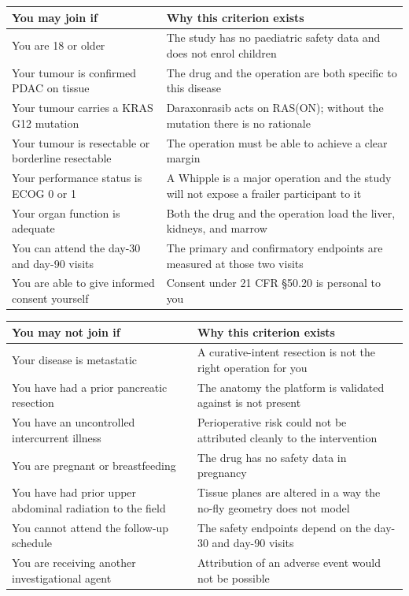 \noindent\begin{tabularx}{\textwidth}{L{5.4cm} Y}
\toprule
\textbf{You may join if} & \textbf{Why this criterion exists} \\
\midrule
You are 18 or older & The study has no paediatric safety data and does not enrol children \\
Your tumour is confirmed PDAC on tissue & The drug and the operation are both specific to this disease \\
Your tumour carries a KRAS G12 mutation & Daraxonrasib acts on RAS(ON); without the mutation there is no rationale \\
Your tumour is resectable or borderline resectable & The operation must be able to achieve a clear margin \\
Your performance status is ECOG 0 or 1 & A Whipple is a major operation and the study will not expose a frailer participant to it \\
Your organ function is adequate & Both the drug and the operation load the liver, kidneys, and marrow \\
You can attend the day-30 and day-90 visits & The primary and confirmatory endpoints are measured at those two visits \\
You are able to give informed consent yourself & Consent under 21 CFR \S 50.20 is personal to you \\
\bottomrule
\end{tabularx}

\vspace{0.30em}

\noindent\begin{tabularx}{\textwidth}{L{5.4cm} Y}
\toprule
\textbf{You may not join if} & \textbf{Why this criterion exists} \\
\midrule
Your disease is metastatic & A curative-intent resection is not the right operation for you \\
You have had a prior pancreatic resection & The anatomy the platform is validated against is not present \\
You have an uncontrolled intercurrent illness & Perioperative risk could not be attributed cleanly to the intervention \\
You are pregnant or breastfeeding & The drug has no safety data in pregnancy \\
You have had prior upper abdominal radiation to the field & Tissue planes are altered in a way the no-fly geometry does not model \\
You cannot attend the follow-up schedule & The safety endpoints depend on the day-30 and day-90 visits \\
You are receiving another investigational agent & Attribution of an adverse event would not be possible \\
\bottomrule
\end{tabularx}

